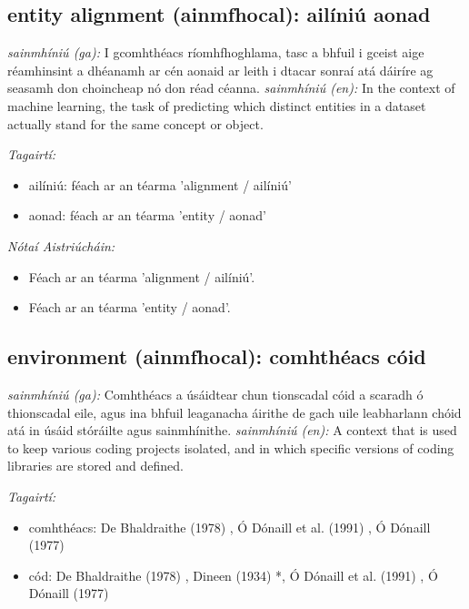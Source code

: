 \documentclass{article}
\begin{document}
\subsection*{entity alignment (ainmfhocal): ailíniú aonad} 
 \noindent \textit{sainmhíniú (ga):} I gcomhthéacs ríomhfhoghlama, tasc a bhfuil i gceist aige réamhinsint a dhéanamh ar cén aonaid ar leith i dtacar sonraí atá dáiríre ag seasamh don choincheap nó don réad céanna.
\newline\newline
 \noindent \textit{sainmhíniú (en):} In the context of machine learning, the task of predicting which distinct entities in a dataset actually stand for the same concept or object.
\newline

 \noindent \textit{Tagairtí:}
\begin{itemize}
	\item ailíniú: féach ar an téarma 'alignment / ailíniú'
	\item aonad: féach ar an téarma 'entity / aonad'
\end{itemize}

 \noindent \textit{Nótaí Aistriúcháin:}
\begin{itemize}
	\item Féach ar an téarma 'alignment / ailíniú'.
	\item Féach ar an téarma 'entity / aonad'.
\end{itemize}


\subsection*{environment (ainmfhocal): comhthéacs cóid} 
 \noindent \textit{sainmhíniú (ga):} Comhthéacs a úsáidtear chun tionscadal cóid a scaradh ó thionscadal eile, agus ina bhfuil leaganacha áirithe de gach uile leabharlann chóid atá in úsáid stóráilte agus sainmhínithe.
\newline\newline
 \noindent \textit{sainmhíniú (en):} A context that is used to keep various coding projects isolated, and in which specific versions of coding libraries are stored and defined.
\newline

 \noindent \textit{Tagairtí:}
\begin{itemize}
	\item comhthéacs: De Bhaldraithe (1978) \cite{de-bhaldraithe}, Ó Dónaill et al. (1991) \cite{focloir-beag}, Ó Dónaill (1977) \cite{odonaill}
	\item cód: De Bhaldraithe (1978) \cite{de-bhaldraithe}, Dineen (1934) \cite{dineen}*, Ó Dónaill et al. (1991) \cite{focloir-beag}, Ó Dónaill (1977) \cite{odonaill}
\end{itemize}
\end{document}

